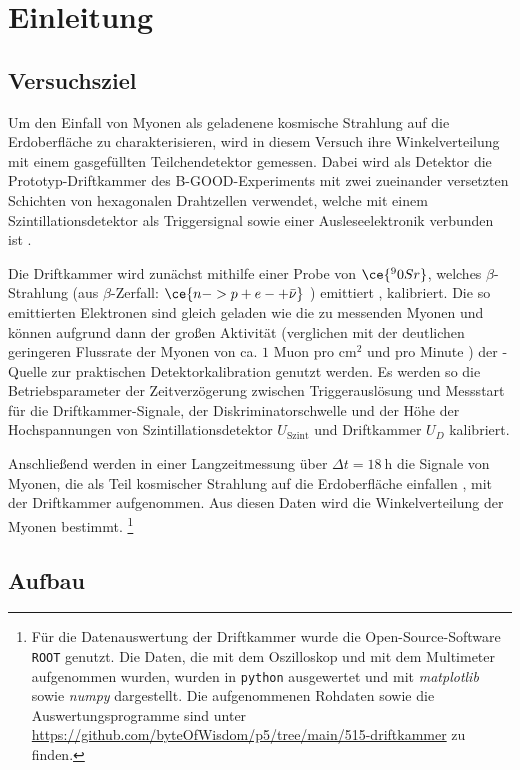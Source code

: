 \chapter{Einleitung}

\section{Versuchsziel}
Um den Einfall von Myonen als geladenene kosmische Strahlung auf die Erdoberfläche zu charakterisieren, wird in diesem Versuch ihre Winkelverteilung mit einem gasgefüllten Teilchendetektor gemessen. Dabei wird als Detektor die Prototyp-Driftkammer des B-GOOD-Experiments \cite[1]{515versuchsanleitung} mit zwei zueinander versetzten Schichten von hexagonalen Drahtzellen verwendet, welche mit einem Szintillationsdetektor als Triggersignal sowie einer Ausleseelektronik verbunden ist \cite[18-20]{hammanndiplom}.

Die Driftkammer wird zunächst mithilfe einer Probe von $\ce{^90Sr}$, welches $\beta$-Strahlung (aus $\beta$-Zerfall: $\ce{n -> p + e- + \bar{\nu}}$ \cite[4]{leotechniques}) emittiert \cite{nudatsr90}, kalibriert. Die so emittierten Elektronen sind gleich geladen wie die zu messenden Myonen und können aufgrund dann der großen Aktivität (verglichen mit der deutlichen geringeren Flussrate der Myonen von ca. $1$ Muon pro $\text{cm}^2$ und pro Minute \cite{astroparticles}) der -Quelle zur praktischen Detektorkalibration genutzt werden. Es werden so die Betriebsparameter der Zeitverzögerung zwischen Triggerauslösung und Messstart für die Driftkammer-Signale, der Diskriminatorschwelle und der Höhe der Hochspannungen von Szintillationsdetektor $U_\text{Szint}$ und Driftkammer $U_D$ kalibriert.

Anschließend werden in einer Langzeitmessung über $\Delta t = \SI{18}{\hour}$ die Signale von Myonen, die als Teil kosmischer Strahlung auf die Erdoberfläche einfallen \cite{muonrays}, mit der Driftkammer aufgenommen. Aus diesen Daten wird die Winkelverteilung der Myonen bestimmt. \footnote{Für die Datenauswertung der Driftkammer wurde die Open-Source-Software \texttt{ROOT}\cite{root} genutzt. Die Daten, die mit dem Oszilloskop und mit dem Multimeter aufgenommen wurden, wurden in \texttt{python} ausgewertet und mit \textit{matplotlib} sowie \textit{numpy} dargestellt. Die aufgenommenen Rohdaten sowie die Auswertungsprogramme sind unter \url{https://github.com/byteOfWisdom/p5/tree/main/515-driftkammer} zu finden.}

\section{Aufbau}

